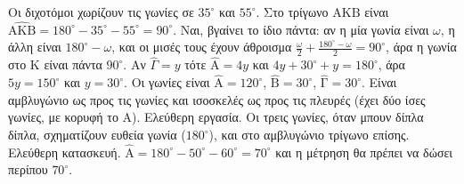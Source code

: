  Οι διχοτόμοι χωρίζουν τις γωνίες σε $35^\circ$ και $55^\circ$. Στο τρίγωνο $\mathrm{ΑΚΒ}$ είναι $\widehat{\mathrm{ΑΚΒ}}=180^\circ-35^\circ-55^\circ=90^\circ$. Ναι, βγαίνει το ίδιο πάντα: αν η μία γωνία είναι $\omega$, η άλλη είναι $180^\circ-\omega$, και οι μισές τους έχουν άθροισμα $\frac{\omega}{2}+\frac{180^\circ-\omega}{2}=90^\circ$, άρα η γωνία στο $\mathrm{Κ}$ είναι πάντα $90^\circ$.
 Αν $\hat{\Gamma}=y$ τότε $\hat{\mathrm{Α}}=4y$ και $4y+30^\circ+y=180^\circ$, άρα $5y=150^\circ$ και $y=30^\circ$. Οι γωνίες είναι $\hat{\mathrm{Α}}=120^\circ$, $\hat{\mathrm{Β}}=30^\circ$, $\hat{\mathrm{Γ}}=30^\circ$. Είναι αμβλυγώνιο ως προς τις γωνίες και ισοσκελές ως προς τις πλευρές (έχει δύο ίσες γωνίες, με κορυφή το $\mathrm{Α}$).
 Ελεύθερη εργασία. Οι τρεις γωνίες, όταν μπουν δίπλα δίπλα, σχηματίζουν ευθεία γωνία ($180^\circ$), και στο αμβλυγώνιο τρίγωνο επίσης.
 Ελεύθερη κατασκευή. $\hat{\mathrm{Α}}=180^\circ-50^\circ-60^\circ=70^\circ$ και η μέτρηση θα πρέπει να δώσει περίπου $70^\circ$.
